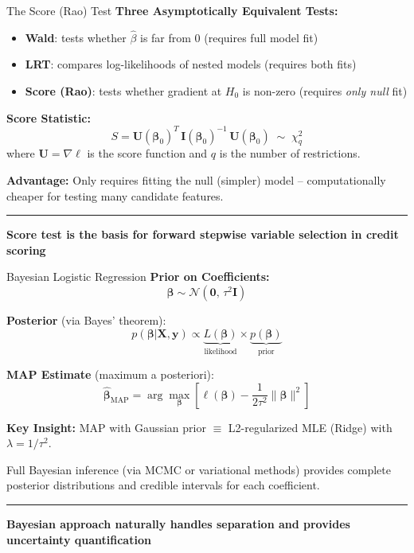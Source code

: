 \documentclass[8pt,aspectratio=169]{beamer}
\newcommand{\bottomnote}[1]{%
\vfill
\vspace{-2mm}
\textcolor{mllavender2}{\rule{\textwidth}{0.4pt}}
\vspace{1mm}
\footnotesize
\textbf{#1}
}
\begin{document}
\begin{frame}[t]{The Score (Rao) Test}
\textbf{Three Asymptotically Equivalent Tests:}
\begin{itemize}
\item \textbf{Wald}: tests whether $\hat{\beta}$ is far from 0 (requires full model fit)
\item \textbf{LRT}: compares log-likelihoods of nested models (requires both fits)
\item \textbf{Score (Rao)}: tests whether gradient at $H_0$ is non-zero (requires \emph{only null} fit)
\end{itemize}

\vspace{0.3em}
\textbf{Score Statistic:}
\begin{equation}
  S = \mathbf{U}(\boldsymbol{\beta}_0)^T\,\mathbf{I}(\boldsymbol{\beta}_0)^{-1}\,\mathbf{U}(\boldsymbol{\beta}_0) \;\sim\; \chi^2_{q}
\end{equation}
where $\mathbf{U} = \nabla\ell$ is the score function and $q$ is the number of restrictions.

\vspace{0.3em}
\textbf{Advantage:} Only requires fitting the null (simpler) model -- computationally cheaper for testing many candidate features.
\bottomnote{Score test is the basis for forward stepwise variable selection in credit scoring}
\end{frame}

\begin{frame}[t]{Bayesian Logistic Regression}
\textbf{Prior on Coefficients:}
\begin{equation}
  \boldsymbol{\beta} \sim \mathcal{N}(\mathbf{0},\, \tau^2 \mathbf{I})
\end{equation}

\textbf{Posterior} (via Bayes' theorem):
\begin{equation}
  p(\boldsymbol{\beta}|\mathbf{X}, \mathbf{y}) \propto \underbrace{L(\boldsymbol{\beta})}_{\text{likelihood}} \times \underbrace{p(\boldsymbol{\beta})}_{\text{prior}}
\end{equation}

\textbf{MAP Estimate} (maximum a posteriori):
\begin{equation}
  \hat{\boldsymbol{\beta}}_{\text{MAP}} = \arg\max_{\boldsymbol{\beta}} \left[\ell(\boldsymbol{\beta}) - \frac{1}{2\tau^2}\|\boldsymbol{\beta}\|^2\right]
\end{equation}

\textbf{Key Insight:} MAP with Gaussian prior $\equiv$ L2-regularized MLE (Ridge) with $\lambda = 1/\tau^2$.

\vspace{0.3em}
Full Bayesian inference (via MCMC or variational methods) provides complete posterior distributions and credible intervals for each coefficient.
\bottomnote{Bayesian approach naturally handles separation and provides uncertainty quantification}
\end{frame}
\end{document}
